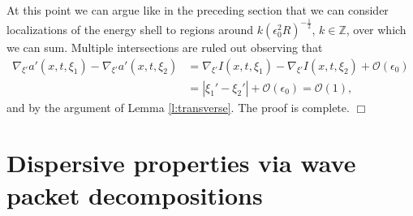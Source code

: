 \documentclass{amsart}
\theoremstyle{definition}
\newcommand{\Z}{\mathbb{Z}}
\begin{document}
At this point we can argue like in the preceding section that we can consider localizations of the energy shell to regions around $k (\epsilon_0^2 R)^{-\frac{1}{2}}$, $k \in \Z$, over which we can sum. Multiple intersections are ruled out observing that
\begin{equation*}
\begin{split}
\nabla_{\xi'} a'(x,t,\xi_1) - \nabla_{\xi'} a'(x,t,\xi_2) &= \nabla_{\xi'} I(x,t,\xi_1) - \nabla_{\xi'} I(x,t,\xi_2) + \mathcal{O}(\epsilon_0) \\
&= |\xi_1'-\xi_2'| + \mathcal{O}(\epsilon_0) = \mathcal{O}(1),
\end{split}
\end{equation*}
and by the argument of Lemma \ref{l:transverse}. The proof is complete. \hfill $\Box$

\appendix

\section{Dispersive properties via wave packet decompositions}
\end{document}
